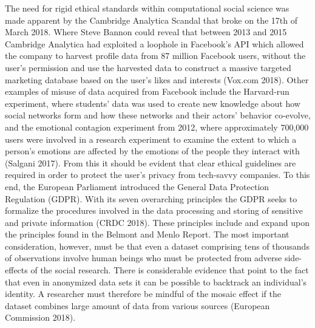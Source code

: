 \documentclass[10pt,a4paper]{report}
\begin{document}
The need for rigid ethical standards within computational social science was made apparent by the Cambridge Analytica Scandal that broke on the 17th of March 2018. Where Steve Bannon could reveal that between 2013 and 2015 Cambridge Analytica had exploited a loophole in Facebook’s API which allowed the company to harvest profile data from 87 million Facebook users, without the user’s permission and use the harvested data to construct a massive targeted marketing database based on the user’s likes and interests (Vox.com 2018). Other examples of misuse of data acquired from Facebook include the Harvard-run experiment, where students' data was used to create new knowledge about how social networks form and how these networks and their actors' behavior co-evolve, and the emotional contagion experiment from 2012, where approximately 700,000 users were involved in a research experiment to examine the extent to which a person's emotions are affected by the emotions of the people they interact with (Salgani 2017).\newline
From this it should be evident that clear ethical guidelines are required in order to protect the user's privacy from tech-savvy companies. To this end, the European Parliament introduced the General Data Protection Regulation (GDPR). With its seven overarching principles the GDPR seeks to formalize the procedures involved in the data processing and storing of sensitive and private information (CRDC 2018). These principles include and expand upon the principles found in the Belmont and Menlo Report. The most important consideration, however, must be that even a dataset comprising tens of thousands of observations involve human beings who must be protected from adverse side-effects of the social research. There is considerable evidence that point to the fact that even in anonymized data sets it can be possible to backtrack an individual's identity. A researcher must therefore be mindful of the mosaic effect if the dataset combines large amount of data from various sources (European Commission 2018).
\end{document}

